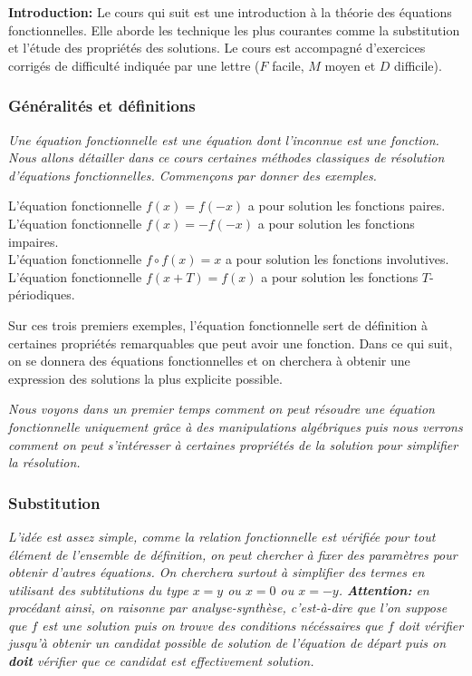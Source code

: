 \textbf{Introduction:} Le cours qui suit est une introduction à la théorie des équations fonctionnelles. Elle aborde les technique les plus courantes comme la substitution et l'étude des propriétés des solutions. Le cours est accompagné d'exercices corrigés de difficulté indiquée par une lettre ($F$ facile, $M$ moyen et $D$ difficile).

\subsubsection{Généralités et définitions}

\emph{Une équation fonctionnelle est une équation dont l'inconnue est une fonction. Nous allons détailler dans ce cours certaines méthodes classiques de résolution d'équations fonctionnelles. Commençons par donner des exemples.}
\begin{ex}
L'équation fonctionnelle $f(x)=f(-x)$ a pour solution les fonctions paires.
\\
L'équation fonctionnelle $f(x)=-f(-x)$ a pour solution les fonctions impaires.
\\
L'équation fonctionnelle $f\circ f(x) = x$ a pour solution les fonctions involutives.
\\
L'équation fonctionnelle $f(x+T)=f(x) $ a pour solution les fonctions $T$-périodiques.
\end{ex}

\begin{rem}
Sur ces trois premiers exemples, l'équation fonctionnelle sert de définition à certaines propriétés remarquables que peut avoir une fonction. Dans ce qui suit, on se donnera des équations fonctionnelles et on cherchera à obtenir une expression des solutions la plus explicite possible.
\end{rem}

\emph{Nous voyons dans un premier temps comment on peut résoudre une équation fonctionnelle uniquement grâce à des manipulations algébriques puis nous verrons comment on peut s'intéresser à certaines propriétés de la solution pour simplifier la résolution.}


\subsubsection{Substitution}

\emph{L'idée est assez simple, comme la relation fonctionnelle est vérifiée pour tout élément de l'ensemble de définition, on peut chercher à fixer des paramètres pour obtenir d'autres équations. On cherchera surtout à simplifier des termes en utilisant des subtitutions du type $x=y$ ou $x=0$ ou $x=-y$. \textbf{Attention:} en procédant ainsi, on raisonne par analyse-synthèse, c'est-à-dire que l'on suppose que $f$ est une solution puis on trouve des conditions nécéssaires que $f$ doit vérifier jusqu'à obtenir un candidat possible de solution de l'équation de départ puis on \textbf{doit} vérifier que ce candidat est effectivement solution. }

